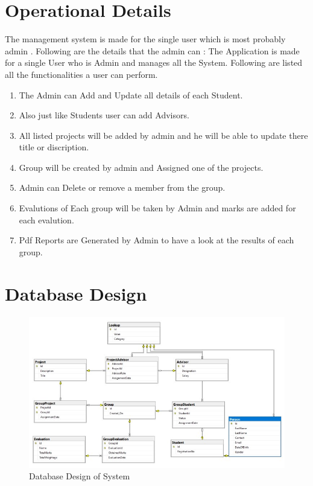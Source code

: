 \documentclass[a4paper, 12pt, oneside]{uet_thesis}
\begin{document}
\chapter{Operational Details}
The management system is made for the single user which is most probably admin . Following are the details that the admin can :
The Application is made for a single User who is Admin and manages all the System. Following are listed all the functionalities a user can perform.

\begin{enumerate}
    \item The Admin can Add and Update all details of each Student. 
    \item Also just like Students user can add Advisors.
    \item All listed projects will be added by admin and he will be able to update there title or discription.
    \item Group will be created by admin and Assigned one of the projects.
    \item Admin can Delete or remove a member from the group.
    \item Evalutions of Each group will be taken by Admin and marks are added for each evalution.
    \item Pdf Reports are Generated by Admin to have a look at the results of each group.
\end{enumerate}
\clearpage

\chapter{Database Design}
\begin{figure}[h]
    \centering
    \includegraphics[width=1\textwidth]{Figures/DB_.jpg}
    \caption{Database Design of System}
    \label{fig:my_label}
\end{figure}
\end{document}
